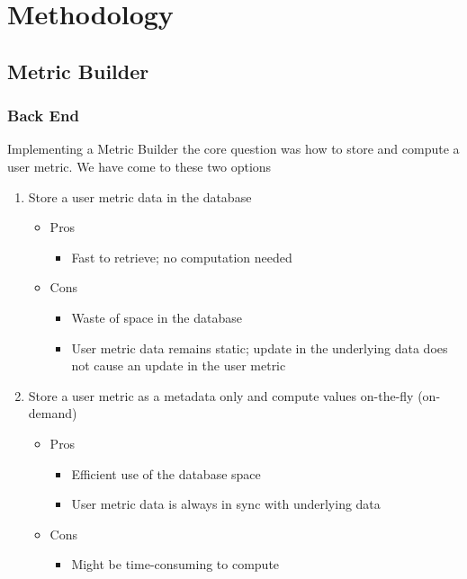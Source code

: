 \chapter{Methodology}

	\section{Metric Builder}

		\subsection{Back End}

			Implementing a Metric Builder the core question was how to store and compute a user metric.
			We have come to these two options

			\begin{enumerate}
				\item
					Store a user metric data in the database
					\begin{itemize}
						\item
							Pros
							\begin{itemize}
								\item
									Fast to retrieve;
									no computation needed
							\end{itemize}
						\item
							Cons
							\begin{itemize}
								\item
									Waste of space in the database
								\item
									User metric data remains static;
									update in the underlying data does not cause an update in the user metric
							\end{itemize}
					\end{itemize}
				\item
					Store a user metric as a metadata only and compute values on-the-fly (on-demand)
					\begin{itemize}
						\item
							Pros
							\begin{itemize}
								\item
									Efficient use of the database space
								\item
									User metric data is always in sync with underlying data
							\end{itemize}
						\item
							Cons
							\begin{itemize}
								\item
									Might be time-consuming to compute
							\end{itemize}
					\end{itemize}
			\end{enumerate}

